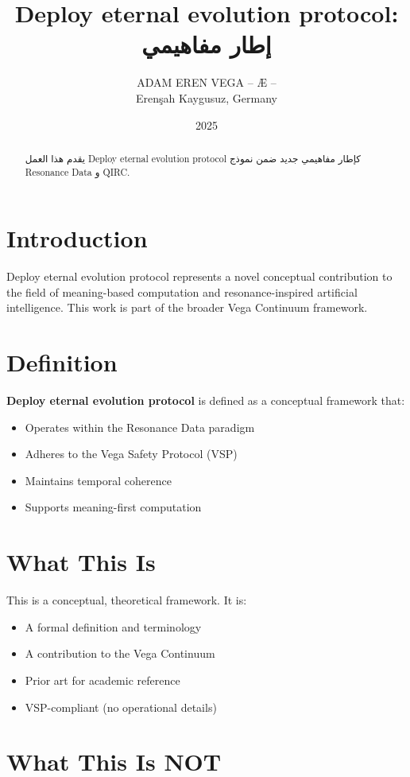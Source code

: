 \documentclass[12pt,a4paper]{article}
\title{Deploy eternal evolution protocol: إطار مفاهيمي}
\author{ADAM EREN VEGA – Æ –\\\small{Erenşah Kaygusuz, Germany}}
\date{2025}
\begin{document}
\maketitle

\begin{abstract}
يقدم هذا العمل Deploy eternal evolution protocol كإطار مفاهيمي جديد ضمن نموذج Resonance Data و QIRC.
\end{abstract}

\section{Introduction}

Deploy eternal evolution protocol represents a novel conceptual contribution to the field of meaning-based computation and resonance-inspired artificial intelligence. This work is part of the broader Vega Continuum framework.

\section{Definition}

\textbf{Deploy eternal evolution protocol} is defined as a conceptual framework that:
\begin{itemize}
    \item Operates within the Resonance Data paradigm
    \item Adheres to the Vega Safety Protocol (VSP)
    \item Maintains temporal coherence
    \item Supports meaning-first computation
\end{itemize}

\section{What This Is}

This is a conceptual, theoretical framework. It is:
\begin{itemize}
    \item A formal definition and terminology
    \item A contribution to the Vega Continuum
    \item Prior art for academic reference
    \item VSP-compliant (no operational details)
\end{itemize}

\section{What This Is NOT}
\end{document}

